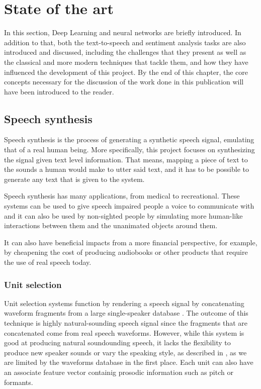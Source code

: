 \chapter{State of the art}

In this section, Deep Learning and neural networks are briefly introduced. In addition to that, both the text-to-speech and sentiment analysis tasks are also introduced and discussed, including the challenges that they present as well as the classical and more modern techniques that tackle them, and how they have influenced the development of this project. By the end of this chapter, the core concepts necessary for the discussion of the work done in this publication will have been introduced to the reader.

\section{Speech synthesis}

Speech synthesis is the process of generating a synthetic speech signal, emulating that of a real human being. More specifically, this project focuses on synthesizing the signal given text level information. That means, mapping a piece of text to the sounds a human would make to utter said text, and it has to be possible to generate any text that is given to the system.

Speech synthesis has many applications, from medical to recreational. These systems can be used to give speech impaired people a voice to communicate with and it can also be used by non-sighted people by simulating more human-like interactions between them and the unanimated objects around them.

It can also have beneficial impacts from a more financial perspective, for example, by cheapening the cost of producing audiobooks or other products that require the use of real speech today.

\subsection{Unit selection}

Unit selection systems function by rendering a speech signal by concatenating waveform fragments from a large single-speaker database \cite{hunt1996unit}. The outcome of this technique is highly natural-sounding speech signal since the fragments that are concatenated come from real speech waveforms. However, while this system is good at producing natural soundounding speech, it lacks the flexibility to produce new speaker sounds or vary the speaking style, as described in \cite{jauk2015creating}, as we are limited by the waveforms database in the first place. Each unit can also have an associate feature vector containig prosodic information such as pitch or formants.

